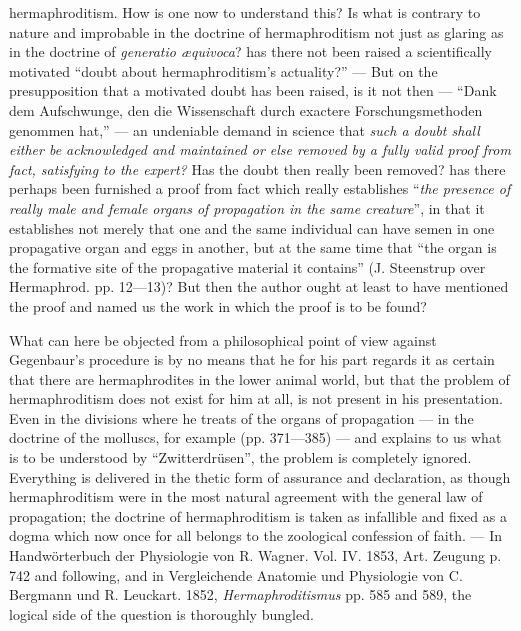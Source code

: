 \documentclass[12pt,a4paper]{book}
\begin{document}
{hermaphroditism. How is one now to understand this? Is what is contrary to nature and
improbable in the doctrine of hermaphroditism not just as glaring as in the doctrine
of \textit{generatio æquivoca}? has there not been raised a scientifically motivated
``doubt about hermaphroditism's actuality?'' --- But on the presupposition that a
motivated doubt has been raised, is it not then --- ``Dank dem Aufschwunge, den die
Wissenschaft durch exactere Forschungsmethoden genommen hat,'' --- an undeniable
demand in science that \emph{such a doubt shall either be acknowledged and maintained
or else removed by a fully valid proof from fact, satisfying to the expert?} Has the
doubt then really been removed? has there perhaps been furnished a proof from fact
which really establishes ``\emph{the presence of really male and female organs of
propagation in the same creature}'', in that it establishes not merely that one and
the same individual can have semen in one propagative organ and eggs in another, but
at the same time that ``the organ is the formative site of the propagative material it
contains'' (J. Steenstrup over Hermaphrod. pp. 12---13)? But then the author ought at
least to have mentioned the proof and named us the work in which the proof is to be
found?

What can here be objected from a philosophical point of view against Gegenbaur's
procedure is by no means that he for his part regards it as certain that there are
hermaphrodites in the lower animal world, but that the problem of hermaphroditism
does not exist for him at all, is not present in his presentation. Even in the
divisions where he treats of the organs of propagation --- in the doctrine of the
molluscs, for example (pp. 371---385) --- and explains to us what is to be understood
by ``Zwitterdrüsen'', the problem is completely ignored. Everything is delivered in the
thetic form of assurance and declaration, as though hermaphroditism were in the most
natural agreement with the general law of propagation; the doctrine of hermaphroditism
is taken as infallible and fixed as a dogma which now once for all belongs to the
zoological confession of faith. --- In Handwörterbuch der Physiologie von R. Wagner.
Vol. IV. 1853, Art. Zeugung p. 742 and following, and in Vergleichende Anatomie und
Physiologie von C. Bergmann und R. Leuckart. 1852, \emph{Hermaphroditismus} pp. 585
and 589, the logical side of the question is thoroughly bungled.}
\end{document}
